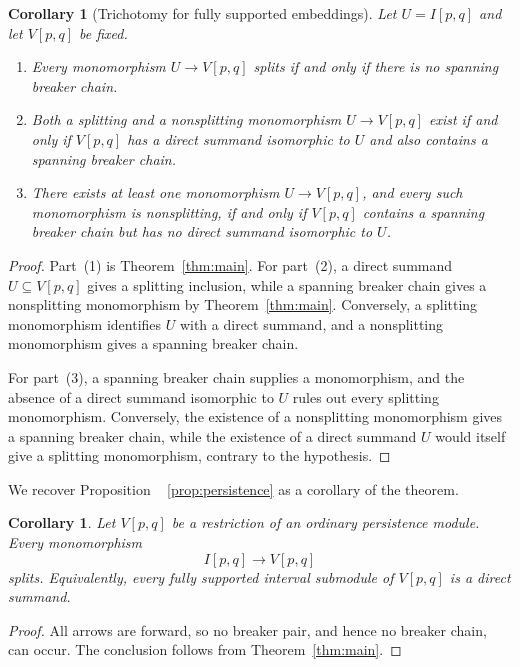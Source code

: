 \documentclass[11pt]{amsart}
\numberwithin{equation}{section}
\newtheorem{corollary}[theorem]{Corollary}
\theoremstyle{definition}
\begin{document}
\begin{corollary}[Trichotomy for fully supported embeddings]\label{cor:trichotomy}
Let $U=I[p,q]$ and let $V[p,q]$ be fixed.
\begin{enumerate}
\item Every monomorphism $U\to V[p,q]$ splits if and only if there is no
spanning breaker chain.
\item Both a splitting and a nonsplitting monomorphism $U\to V[p,q]$ exist
if and only if $V[p,q]$ has a direct summand isomorphic to $U$ and also
contains a spanning breaker chain.
\item There exists at least one monomorphism $U\to V[p,q]$, and every such
monomorphism is nonsplitting, if and only if $V[p,q]$ contains a spanning
breaker chain but has no direct summand isomorphic to $U$.
\end{enumerate}
\end{corollary}

\begin{proof}
Part~(1) is Theorem~\ref{thm:main}.  For part~(2), a direct summand
$U\subseteq V[p,q]$ gives a splitting inclusion, while a spanning breaker
chain gives a nonsplitting monomorphism by Theorem~\ref{thm:main}.
Conversely, a splitting monomorphism identifies $U$ with a direct summand,
and a nonsplitting monomorphism gives a spanning breaker chain.

For part~(3), a spanning breaker chain supplies a monomorphism, and the
absence of a direct summand isomorphic to $U$ rules out every splitting
monomorphism.  Conversely, the existence of a nonsplitting monomorphism gives
a spanning breaker chain, while the existence of a direct summand $U$ would
itself give a splitting monomorphism, contrary to the hypothesis.
\end{proof}
We recover Proposition ~ \ref{prop:persistence} as a corollary of the theorem.

\begin{corollary} \label{cor:persistence-splitting}
Let $V[p,q]$ be a restriction of an ordinary persistence module.  Every
monomorphism
\[
I[p,q]\longrightarrow V[p,q]
\]
splits.  Equivalently, every fully supported interval submodule of
$V[p,q]$ is a direct summand.
\end{corollary}

\begin{proof}
All arrows are forward, so no breaker pair, and hence no breaker chain, can
occur.  The conclusion follows from Theorem~\ref{thm:main}.
\end{proof}
\end{document}
